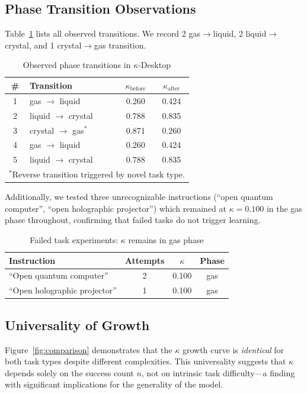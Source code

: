 \documentclass[10pt,twocolumn]{article}
\newcommand{\kap}{\kappa}
\newcommand{\kdes}{$\kappa$-Desktop}
\begin{document}
\subsection{Phase Transition Observations}

Table~\ref{tab:transitions} lists all observed transitions. 
We record 2 gas$\to$liquid, 2 liquid$\to$crystal, and 1 
crystal$\to$gas transition.

\begin{table}[H]
\centering
\caption{Observed phase transitions in \kdes{}}
\label{tab:transitions}
\begin{tabular}{clcc}
\toprule
\# & Transition & $\kap_{\text{before}}$ & 
  $\kap_{\text{after}}$ \\
\midrule
1 & gas $\to$ liquid & 0.260 & 0.424 \\
2 & liquid $\to$ crystal & 0.788 & 0.835 \\
3 & crystal $\to$ gas$^*$ & 0.871 & 0.260 \\
4 & gas $\to$ liquid & 0.260 & 0.424 \\
5 & liquid $\to$ crystal & 0.788 & 0.835 \\
\bottomrule
\multicolumn{4}{l}{\footnotesize $^*$Reverse transition 
  triggered by novel task type.}
\end{tabular}
\end{table}

Additionally, we tested three unrecognizable instructions 
(``open quantum computer'', ``open holographic projector'') 
which remained at $\kap = 0.100$ in the gas phase 
throughout, confirming that failed tasks do not trigger 
learning.

\begin{table}[H]
\centering
\caption{Failed task experiments: $\kappa$ remains in gas 
  phase}
\label{tab:failed}
\begin{tabular}{lccc}
\toprule
Instruction & Attempts & $\kappa$ & Phase \\
\midrule
``Open quantum computer'' & 2 & 0.100 & gas \\
``Open holographic projector'' & 1 & 0.100 & gas \\
\bottomrule
\end{tabular}
\end{table}

\subsection{Universality of Growth}

Figure~\ref{fig:comparison} demonstrates that the $\kap$ 
growth curve is \textit{identical} for both task types 
despite different complexities. This universality suggests 
that $\kap$ depends solely on the success count $n$, not on 
intrinsic task difficulty---a finding with significant 
implications for the generality of the model.
\end{document}

